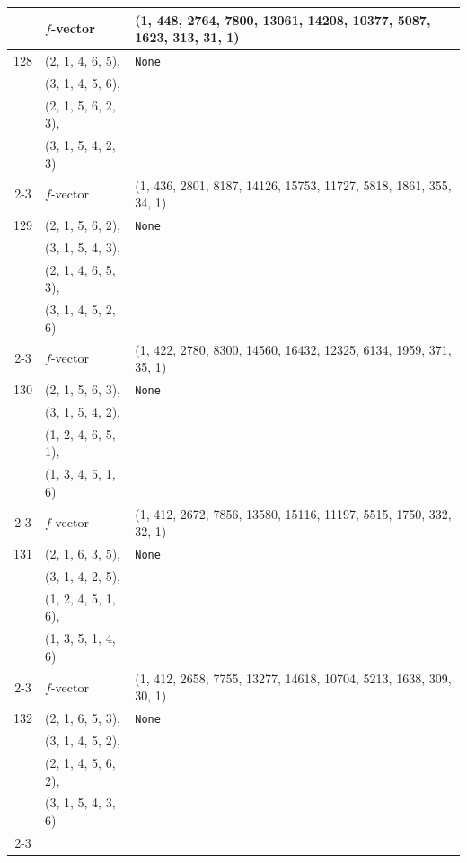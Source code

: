 \documentclass[10pt]{amsart}
\numberwithin{equation}{section}
\theoremstyle{plain}
\theoremstyle{definition}
\theoremstyle{remark}
\begin{document}
{\begin{longtable}{c|l|l}
		& $f$-vector & {(1, 448, 2764, 7800, 13061, 14208, 10377, 5087, 1623, 313, 31, 1)} \\
		\midrule
		
		128 & (2, 1, 4, 6, 5), & \texttt{None} \\
		& (3, 1, 4, 5, 6), &  \\
		& (2, 1, 5, 6, 2, 3), &  \\
		& (3, 1, 5, 4, 2, 3) &  \\ \cline{2-3}
		
		& $f$-vector & {(1, 436, 2801, 8187, 14126, 15753, 11727, 5818, 1861, 355, 34, 1)} \\
		\midrule
		
		129 & (2, 1, 5, 6, 2), & \texttt{None} \\
		& (3, 1, 5, 4, 3), &  \\
		& (2, 1, 4, 6, 5, 3), &  \\
		& (3, 1, 4, 5, 2, 6) &  \\ \cline{2-3}
		
		& $f$-vector & {(1, 422, 2780, 8300, 14560, 16432, 12325, 6134, 1959, 371, 35, 1)} \\
		\midrule
		
		130 & (2, 1, 5, 6, 3), & \texttt{None} \\
		& (3, 1, 5, 4, 2), &  \\
		& (1, 2, 4, 6, 5, 1), &  \\
		& (1, 3, 4, 5, 1, 6) &  \\ \cline{2-3}
		
		& $f$-vector & {(1, 412, 2672, 7856, 13580, 15116, 11197, 5515, 1750, 332, 32, 1)} \\
		\midrule
		
		131 & (2, 1, 6, 3, 5), & \texttt{None} \\
		& (3, 1, 4, 2, 5), &  \\
		& (1, 2, 4, 5, 1, 6), &  \\
		& (1, 3, 5, 1, 4, 6) &  \\ \cline{2-3}
		
		& $f$-vector & {(1, 412, 2658, 7755, 13277, 14618, 10704, 5213, 1638, 309, 30, 1)} \\
		\midrule
		
		132 & (2, 1, 6, 5, 3), & \texttt{None} \\
		& (3, 1, 4, 5, 2), &  \\
		& (2, 1, 4, 5, 6, 2), &  \\
		& (3, 1, 5, 4, 3, 6) &  \\ \cline{2-3}
		

\end{longtable}}
\end{document}
